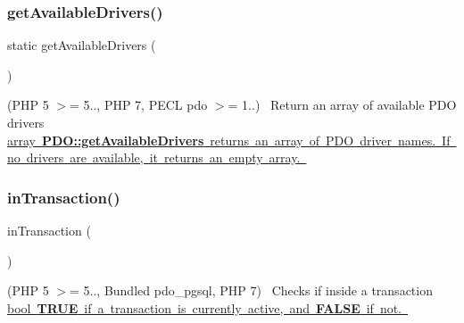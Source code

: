 \subsubsection{\texorpdfstring{get\+Available\+Drivers()}{getAvailableDrivers()}}
{\footnotesize\ttfamily static get\+Available\+Drivers (\begin{DoxyParamCaption}{ }\end{DoxyParamCaption})\hspace{0.3cm}{\ttfamily [static]}}

(P\+HP 5 $>$= 5.., P\+HP 7, P\+E\+CL pdo $>$= 1..)~\newline
 Return an array of available P\+DO drivers \mbox{\hyperlink{}{array {\bfseries P\+D\+O\+::get\+Available\+Drivers} returns an array of P\+DO driver names. If no drivers are available, it returns an empty array. }}\mbox{\label{interface_pes_1_1_database_1_1_handler_1_1_p_d_o_interface_aaf34a959f7c26d1f97713adab5a6c429}} 
\subsubsection{\texorpdfstring{in\+Transaction()}{inTransaction()}}
{\footnotesize\ttfamily in\+Transaction (\begin{DoxyParamCaption}{ }\end{DoxyParamCaption})}

(P\+HP 5 $>$= 5.., Bundled pdo\+\_\+pgsql, P\+HP 7)~\newline
 Checks if inside a transaction \mbox{\hyperlink{}{bool {\bfseries T\+R\+UE} if a transaction is currently active, and {\bfseries F\+A\+L\+SE} if not. }}\mbox{\label{interface_pes_1_1_database_1_1_handler_1_1_p_d_o_interface_a9f9cb8ca720d7bbcb03869def521336e}} 

